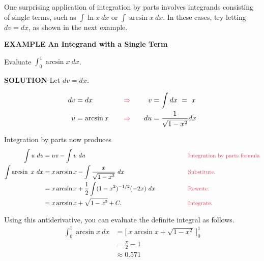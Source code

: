 \documentclass[12pt]{article}
\begin{document}
One surprising application of integration by parts involves integrands consisting of single terms, such as $\int \ln x \ dx$ or $ \int \arcsin x \ dx$. In these cases, try letting $dv = dx$, as shown in the next example.

\bigskip

\sffamily
\noindent \color{myblue} \large \textbf{EXAMPLE} \color{black} \normalsize \textbf{An Integrand with a Single Term}
\rmfamily

\bigskip

\noindent Evaluate $ \displaystyle \int_0^1 \arcsin x \ dx$.

\bigskip

\sffamily
\noindent \color{myblue} \textbf{SOLUTION} \color{black} \rmfamily \hspace{.3cm} Let $dv = dx$.

\begin{alignat*}{3}
dv &= dx       &  \hspace{.3cm} &\color{mypink} \Rightarrow \color{black}   & \hspace{.5cm}  v&= \int dx \ = \ x \\
u &= \arcsin x &   &\color{mypink} \Rightarrow \color{black}   &   du&= \frac{1}{\sqrt{1-x^2}} dx \\
\end{alignat*}

\noindent Integration by parts now produces
\begin{alignat*}{2}
\int u \ dv &= uv - \int v \ du \ \hspace{2cm} &&\text{\color{mypink}\small Integration by parts formula}\\
 \int \arcsin \ x \ dx &= x \arcsin x - \int \frac{x}{\sqrt{1-x^2}} \ dx \hspace{2cm} &&\text{\color{mypink}\small Substitute.}\\
 &= x \arcsin x + \frac{1}{2} \int (1 - x^2)^{-1/2} (-2x) \ dx \hspace{1.5cm} &&\text{\color{mypink}\small Rewrite.}\\
 &= x \arcsin x + \sqrt{1 - x^2} + C. &&\text{\color{mypink}\small Integrate.}
\end{alignat*}

\noindent Using this antiderivative, you can evaluate the definite integral as follows.
\begin{align*}
\int_0^1 \arcsin x \ dx &= \bigg[ \ x \arcsin x + \sqrt{1 - x^2} \ \bigg]_0^1 \\
&= \frac{\pi}{2} - 1 \\
&\approx 0.571
\end{align*}
\end{document}
